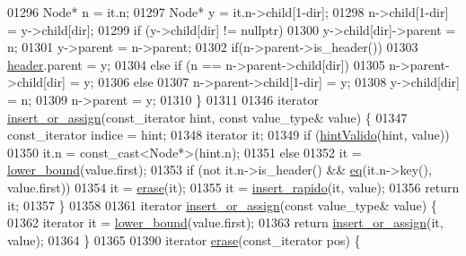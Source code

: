 \begin{DoxyCode}
01296         Node* n = it.n;
01297         Node* y = it.n->child[1-dir];
01298         n->child[1-dir] = y->child[dir];
01299         \textcolor{keywordflow}{if} (y->child[dir] != \textcolor{keyword}{nullptr})
01300             y->child[dir]->parent = n;
01301         y->parent = n->parent;
01302         \textcolor{keywordflow}{if}(n->parent->is\_header())
01303             \hyperlink{classaed2_1_1map_a92d93f905c8ad73fba18fdc7e8915cce_a92d93f905c8ad73fba18fdc7e8915cce}{header}.parent = y;
01304         \textcolor{keywordflow}{else} if (n == n->parent->child[dir])
01305             n->parent->child[dir] = y;
01306         \textcolor{keywordflow}{else}
01307             n->parent->child[1-dir] = y;
01308         y->child[dir] = n;
01309         n->parent = y;
01310     \}
01311 
01346     iterator \hyperlink{classaed2_1_1map_a2ef6723c183916276b0afc4a4c721475_a2ef6723c183916276b0afc4a4c721475}{insert_or_assign}(const\_iterator hint, \textcolor{keyword}{const} value\_type& value) \{
01347         const\_iterator indice = hint;
01348         iterator it;
01349         \textcolor{keywordflow}{if} (\hyperlink{classaed2_1_1map_a45b04533e9acf27438813ab4a2604443_a45b04533e9acf27438813ab4a2604443}{hintValido}(hint, value))
01350             it.n = \textcolor{keyword}{const\_cast<}Node*\textcolor{keyword}{>}(hint.n);
01351         \textcolor{keywordflow}{else}
01352             it = \hyperlink{classaed2_1_1map_a3399d36fdd5a880b494f3a5795d3f18f_a3399d36fdd5a880b494f3a5795d3f18f}{lower_bound}(value.first);
01353         \textcolor{keywordflow}{if} (not it.n->is\_header() && \hyperlink{classaed2_1_1map_ab45cb28bb215cd229383d88b96b3f624_ab45cb28bb215cd229383d88b96b3f624}{eq}(it.n->key(), value.first))
01354             it = \hyperlink{classaed2_1_1map_ad8e796bf9c9c558e5ce6b61e116253fe_ad8e796bf9c9c558e5ce6b61e116253fe}{erase}(it);
01355         it = \hyperlink{classaed2_1_1map_a4b4f1e65ee9aeccee4046d53fd5fd8a4_a4b4f1e65ee9aeccee4046d53fd5fd8a4}{insert_rapido}(it, value);
01356         \textcolor{keywordflow}{return} it;
01357     \}
01358 
01361     iterator \hyperlink{classaed2_1_1map_a2ef6723c183916276b0afc4a4c721475_a2ef6723c183916276b0afc4a4c721475}{insert_or_assign}(\textcolor{keyword}{const} value\_type& value) \{
01362         iterator it = \hyperlink{classaed2_1_1map_a3399d36fdd5a880b494f3a5795d3f18f_a3399d36fdd5a880b494f3a5795d3f18f}{lower_bound}(value.first);
01363         \textcolor{keywordflow}{return} \hyperlink{classaed2_1_1map_a2ef6723c183916276b0afc4a4c721475_a2ef6723c183916276b0afc4a4c721475}{insert_or_assign}(it, value);
01364     \}
01365 
01390     iterator \hyperlink{classaed2_1_1map_ad8e796bf9c9c558e5ce6b61e116253fe_ad8e796bf9c9c558e5ce6b61e116253fe}{erase}(const\_iterator pos) \{

\end{DoxyCode}
